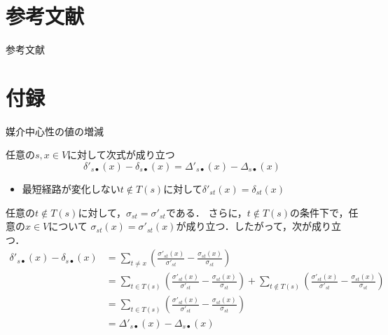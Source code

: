 \documentclass[dvipdfmx,fleqn]{beamer}
\begin{document}
\appendix
\section{参考文献}
\begin{frame}[allowframebreaks]{参考文献}
  \nocite{01Watts1998}
  \nocite{02Barabasi1999}
  \nocite{03Beauchamp1965}
  \nocite{04Bonacich1991}
  \nocite{05Freeman1977}
  \nocite{06Brandes2001}
  \nocite{07Puzis2012}
  \nocite{08Bentert2018}
  \nocite{09Erdos2015}
  \nocite{10Bader2006}
  \nocite{11Tan2009}
  \nocite{12Edmonds2010}
  \nocite{13Bernaschi2016}
  \nocite{14Brandes2007}
  \nocite{15Bader2007}
  \nocite{16Pfeffer2012}
  \nocite{17Yoshida2014}
  \nocite{18Holme2012}
  \nocite{19Lee2012}
  \nocite{20Singh2015}
  \nocite{21Hayashi2015}
  \nocite{22Bergamini2015a}
  \nocite{23Bergamini2015b}
  \nocite{24Ramalingam1996}
  \nocite{25Kas2013}
  \nocite{26Karger1993}
  \nocite{27Nasre2014a}
  \nocite{28Demetrescu2003}
  \nocite{29Nasre2014b}
  \nocite{30Pontecorvi2015}
  \nocite{31Bergamini2017}
  \nocite{32Leskovec2016}
  \nocite{33Rozemberczki2019b}
  \nocite{34OpenStreetMap}
  \printbibliography[title=]
\end{frame}

\section{付録}
\begin{frame}{媒介中心性の値の増減}
  \begin{theorem}\small
    任意の$s,x\in V$に対して次式が成り立つ
    \begin{equation*}
      \delta'_{s\bullet}(x)-\delta_{s\bullet}(x)=\Delta'_{s\bullet}(x)-\Delta_{s\bullet}(x)
    \end{equation*}
  \end{theorem}
  \begin{itemize}
  \item 最短経路が変化しない$t\notin T(s)$に対して$\delta'_{st}(x)=\delta_{st}(x)$
  \end{itemize}
  \medskip
  \scriptsize
  任意の$t\notin T(s)$に対して，$\sigma_{st}=\sigma'_{st}$である．
  さらに，$t\notin T(s)$の条件下で，任意の$x\in V$について
  $\sigma_{st}(x)=\sigma'_{st}(x)$が成り立つ．したがって，次が成り立つ．
  \begin{equation*}
    \begin{aligned}
      \delta'_{s\bullet}(x)-\delta_{s\bullet}(x)
      &=\sum_{t\neq x}\left(\frac{\sigma'_{st}(x)}{\sigma'_{st}}-\frac{\sigma_{st}(x)}{\sigma_{st}}\right) \\
      &=\sum_{t\in T(s)}\left(\frac{\sigma'_{st}(x)}{\sigma'_{st}}-\frac{\sigma_{st}(x)}{\sigma_{st}}\right)
      +\sum_{t\notin T(s)}\left(\frac{\sigma'_{st}(x)}{\sigma'_{st}}-\frac{\sigma_{st}(x)}{\sigma_{st}}\right) \\
      &=\sum_{t\in T(s)}\left(\frac{\sigma'_{st}(x)}{\sigma'_{st}}-\frac{\sigma_{st}(x)}{\sigma_{st}}\right) \\
      &=\Delta'_{s\bullet}(x)-\Delta_{s\bullet}(x)
    \end{aligned}
  \end{equation*}
\end{frame}
\end{document}
